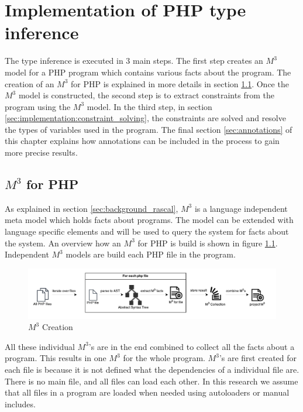 \documentclass[../main.tex]{subfiles}
\begin{document}
    \chapter{Implementation of PHP type inference}\label{ch:inference_implementation}

    The type inference is executed in 3 main steps.
    The first step creates an $M^3$ model for a PHP program which contains various facts about the program. 
    The creation of an $M^3$ for PHP is explained in more details in section \ref{sec:m3_for_php}.
    Once the $M^3$ model is constructed, the second step is to extract constraints from the program using the $M^3$ model.
    In the third step, in section \ref{sec:implementation:constraint_solving}, the constraints are solved and resolve the types of variables used in the program.
    The final section \ref{sec:annotations} of this chapter explains how annotations can be included in the process to gain more precise results.
    
    \section{$M^3$ for PHP}\label{sec:m3_for_php}
    As explained in section \ref{sec:background_rascal}, $M^3$ is a language independent meta model which holds facts about programs.
    The model can be extended with language specific elements and will be used to query the system for facts about the system.
    An overview how an $M^3$ for PHP is build is shown in figure \ref{fig:research_m3_creation}.
    Independent $M^3$ models are build each PHP file in the program.
    
    \begin{figure}[H]
        \centerline{\includegraphics{Diagrams/M3Creation.pdf}}
        \caption{$M^3$ Creation}
        \label{fig:research_m3_creation}
    \end{figure}
    
    All these individual $M^3$'s are in the end combined to collect all the facts about a program.
    This results in one $M^3$ for the whole program.
    $M^3$'s are first created for each file is because it is not defined what the dependencies of a individual file are.
    There is no main file, and all files can load each other.
    In this research we assume that all files in a program are loaded when needed using autoloaders or manual includes.
    
\end{document}
